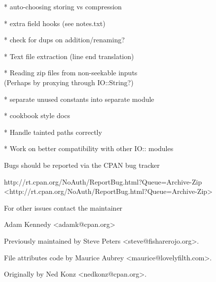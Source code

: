 \documentclass[]{article}
\begin{document}

* auto-choosing storing vs compression

* extra field hooks (see notes.txt)

* check for dups on addition/renaming?

* Text file extraction (line end translation)

* Reading zip files from non-seekable inputs \\ (Perhaps by proxying
through IO::String?)

* separate unused constants into separate module

* cookbook style docs

* Handle tainted paths correctly

* Work on better compatibility with other IO:: modules


Bugs should be reported via the CPAN bug tracker

http://rt.cpan.org/NoAuth/ReportBug.html?Queue=Archive-Zip
\textless{}http://rt.cpan.org/NoAuth/ReportBug.html?Queue=Archive-Zip\textgreater{}

For other issues contact the maintainer


Adam Kennedy \textless{}adamk@cpan.org\textgreater{}

Previously maintained by Steve Peters
\textless{}steve@fisharerojo.org\textgreater{}.

File attributes code by Maurice Aubrey
\textless{}maurice@lovelyfilth.com\textgreater{}.

Originally by Ned Konz \textless{}nedkonz@cpan.org\textgreater{}.

\end{document}
